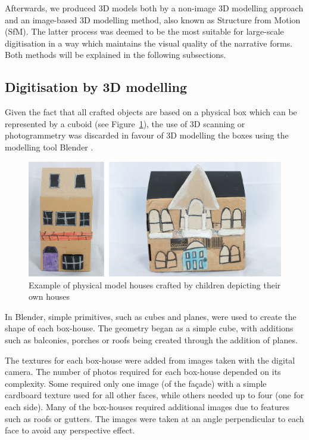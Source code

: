 \documentclass[acmlarge,screen,dvipsnames]{acmart}
\begin{document}
Afterwards, we produced 3D models both by a non-image 3D modelling approach and an image-based 3D modelling method, also known as Structure from Motion (SfM). The latter process was deemed to be the most suitable for large-scale digitisation in a way which maintains the visual quality of the narrative forms. Both methods will be explained in the following subsections.

\color{black}

\subsection{Digitisation by 3D modelling}
Given the fact that all crafted objects are based on a physical box
which can be represented by a cuboid (see Figure~\ref{fig:boxes}), the use of
3D scanning or photogrammetry was discarded in favour of 3D modelling the
boxes using the modelling tool Blender \cite{blender}. 


\begin{figure}[h] \centering
\includegraphics[width=0.7\linewidth]{images/boxes.png} \caption{Example
of physical model houses crafted by children depicting their own houses}
\label{fig:boxes} \end{figure}

In Blender, simple primitives, such as cubes and planes, were used
to create the shape of each box-house. The geometry began as
a simple cube, with additions such as balconies, porches or roofs being
created through the addition of planes.


The textures for each box-house were added from images taken with the digital
camera. The number of photos required for each box-house depended on its complexity. Some required only one image (of the fa\c{c}ade) with a simple
 cardboard texture used for all other faces, while others needed up to four
 (one for each side). Many of the box-houses required additional images due to
 features such as roofs or gutters. The images were taken at an angle
 perpendicular to each face to avoid any perspective effect. 

\end{document}
